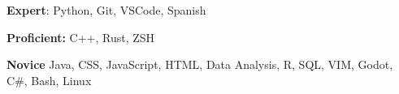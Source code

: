 \documentclass[../main.tex]{subfiles}
\begin{document}
 \textbf{Expert}: Python, Git, VSCode, Spanish

 \textbf{Proficient:} C++, Rust, ZSH

 \textbf{Novice} Java, CSS, JavaScript, HTML, Data Analysis, R, SQL, VIM, Godot, C\#, Bash, Linux
\end{document}
